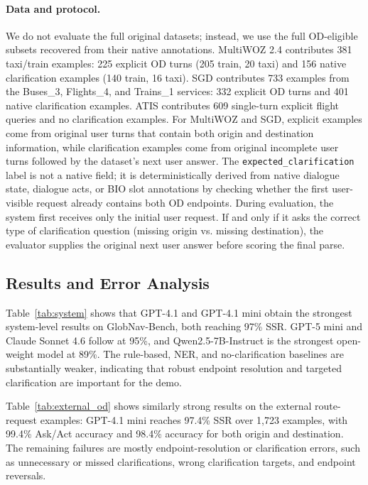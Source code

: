 \documentclass[11pt]{article}
\newcommand{\bench}{GlobNav-Bench\xspace}
\begin{document}
\paragraph{Data and protocol.}
We do not evaluate the full original datasets; instead, we use the full OD-eligible subsets recovered from their native annotations. MultiWOZ 2.4 contributes 381 taxi/train examples: 225 explicit OD turns (205 train, 20 taxi) and 156 native clarification examples (140 train, 16 taxi). SGD contributes 733 examples from the Buses\_3, Flights\_4, and Trains\_1 services: 332 explicit OD turns and 401 native clarification examples. ATIS contributes 609 single-turn explicit flight queries and no clarification examples. For MultiWOZ and SGD, explicit examples come from original user turns that contain both origin and destination information, while clarification examples come from original incomplete user turns followed by the dataset's next user answer. The \texttt{expected\_clarification} label is not a native field; it is deterministically derived from native dialogue state, dialogue acts, or BIO slot annotations by checking whether the first user-visible request already contains both OD endpoints. During evaluation, the system first receives only the initial user request. If and only if it asks the correct type of clarification question (missing origin vs. missing destination), the evaluator supplies the original next user answer before scoring the final parse.

\subsection{Results and Error Analysis}



Table~\ref{tab:system} shows that GPT-4.1 and GPT-4.1 mini obtain the strongest system-level results on \bench, both reaching 97\% SSR. GPT-5 mini and Claude Sonnet 4.6 follow at 95\%, and Qwen2.5-7B-Instruct is the strongest open-weight model at 89\%. The rule-based, NER, and no-clarification baselines are substantially weaker, indicating that robust endpoint resolution and targeted clarification are important for the demo.

Table~\ref{tab:external_od} shows similarly strong results on the external route-request examples: GPT-4.1 mini reaches 97.4\% SSR over 1,723 examples, with 99.4\% Ask/Act accuracy and 98.4\% accuracy for both origin and destination. The remaining failures are mostly endpoint-resolution or clarification errors, such as unnecessary or missed clarifications, wrong clarification targets, and endpoint reversals.
\end{document}
